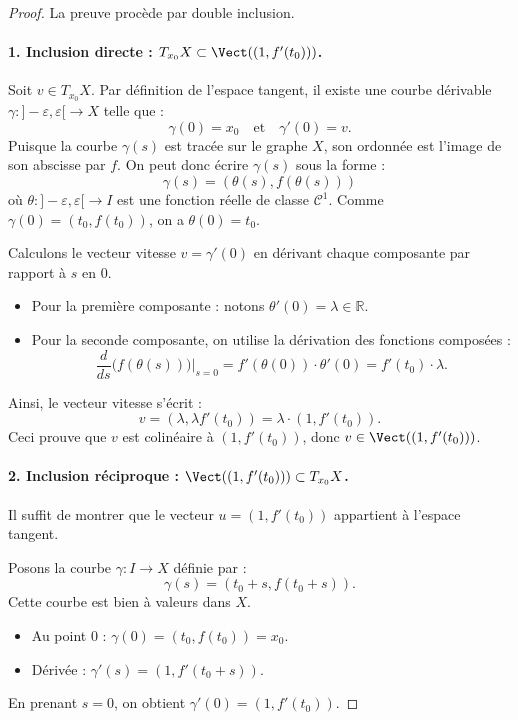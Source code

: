 \begin{proof}
    La preuve procède par double inclusion.

    \paragraph{1. Inclusion directe : $T_{x_0}X \subset \Vect((1, f'(t_0)))$.}

    Soit $v \in T_{x_0}X$. Par définition de l'espace tangent, il existe une courbe dérivable $\gamma : ]-\varepsilon, \varepsilon[ \to X$ telle que :
    \[
        \gamma(0) = x_0 \quad \text{et} \quad \gamma'(0) = v.
    \]
    Puisque la courbe $\gamma(s)$ est tracée sur le graphe $X$, son ordonnée est l'image de son abscisse par $f$. On peut donc écrire $\gamma(s)$ sous la forme :
    \[
        \gamma(s) = (\theta(s), f(\theta(s)))
    \]
    où $\theta : ]-\varepsilon, \varepsilon[ \to I$ est une fonction réelle de classe $\mathscr{C}^1$.
    Comme $\gamma(0) = (t_0, f(t_0))$, on a $\theta(0) = t_0$.
    
    Calculons le vecteur vitesse $v = \gamma'(0)$ en dérivant chaque composante par rapport à $s$ en $0$.
    \begin{itemize}
        \item Pour la première composante : notons $\theta'(0) = \lambda \in \mathbb{R}$.
        \item Pour la seconde composante, on utilise la dérivation des fonctions composées :
        \[
            \frac{d}{ds}\Big( f(\theta(s)) \Big)\Big|_{s=0} = f'(\theta(0)) \cdot \theta'(0) = f'(t_0) \cdot \lambda.
        \]
    \end{itemize}
    
    Ainsi, le vecteur vitesse s'écrit :
    \[
        v = (\lambda, \lambda f'(t_0)) = \lambda \cdot (1, f'(t_0)).
    \]
    Ceci prouve que $v$ est colinéaire à $(1, f'(t_0))$, donc $v \in \Vect((1, f'(t_0)))$.

    \paragraph{2. Inclusion réciproque : $\Vect((1, f'(t_0))) \subset T_{x_0}X$.}

    Il suffit de montrer que le vecteur $u = (1, f'(t_0))$ appartient à l'espace tangent.
    
    Posons la courbe $\gamma : I \to X$ définie par :
    \[
        \gamma(s) = (t_0 + s, f(t_0 + s)).
    \]
    Cette courbe est bien à valeurs dans $X$.
    \begin{itemize}
        \item Au point 0 : $\gamma(0) = (t_0, f(t_0)) = x_0$.
        \item Dérivée : $\gamma'(s) = (1, f'(t_0 + s))$.
    \end{itemize}
    En prenant $s=0$, on obtient $\gamma'(0) = (1, f'(t_0))$.
    

\end{proof}
